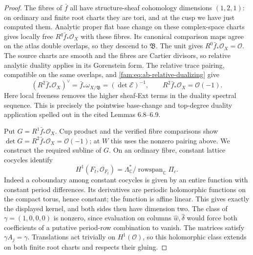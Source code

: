 \begin{proof}
The fibres of $\bar f$ all have structure-sheaf cohomology dimensions
$(1,2,1)$: on ordinary and finite root charts they are tori, and at
the cusp we have just computed them. Analytic proper flat base change
on these complex-space charts gives locally free $R^q\bar f_*\mathcal O_X$
with these fibres. Its canonical comparison maps agree on the atlas
double overlaps, so they descend to $\mathfrak B$. The unit gives
$R^0\bar f_*\mathcal O_X=\mathcal O$.
The source charts are smooth and the fibres are Cartier divisors,
so relative analytic duality applies in its Gorenstein form. The
relative trace pairing, compatible on the same overlaps, and
\eqref{fam:eq:ab-relative-dualizing} give
\[
 (R^2\bar f_*\mathcal O_X)^\vee
 =\bar f_*\omega_{X/\mathfrak B}
 =(\det\mathcal E)^{-1},
 \qquad R^2\bar f_*\mathcal O_X=\mathcal O(-1).
\]
Here local freeness removes the higher sheaf-Ext terms in the duality
spectral sequence. This is precisely the pointwise base-change and
top-degree duality application spelled out in the cited Lemmas 6.8--6.9.

Put $G=R^1\bar f_*\mathcal O_X$. Cup product and the verified fibre
comparisons show $\det G=R^2\bar f_*\mathcal O_X=\mathcal O(-1)$;
at $W$ this uses the nonzero pairing above.
We construct the required subline of $G$. On an ordinary fibre,
constant lattice cocycles identify
\[
 H^1(F_t,\mathcal O_{F_t})
 =\Lambda_{\mathbb C}^*/\operatorname{rowspan}_{\mathbb C}\Pi_c.
\]
Indeed a coboundary among constant cocycles is given by an entire
function with constant period differences. Its derivatives are
periodic holomorphic functions on the compact torus, hence constant;
the function is affine linear. This gives exactly the displayed
kernel, and both sides then have dimension two. The class of
$\gamma=(1,0,0,0)$ is nonzero, since evaluation on columns
$\widehat w,\widehat\delta$ would force both coefficients of a
putative period-row combination to vanish.
The matrices satisfy $\gamma A_j=\gamma$. Translations act trivially
on $H^1(\mathcal O)$, so this holomorphic class extends on both finite
root charts and respects their gluing.


\end{proof}

